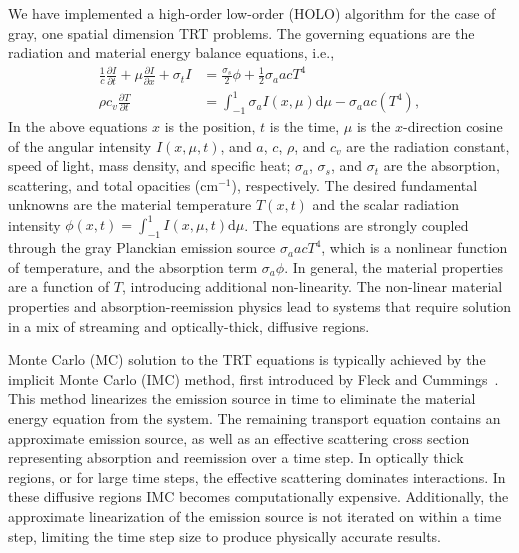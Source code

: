 \documentclass{mc2013}
\newcommand{\pderiv}[2]{\frac{\partial #1}{\partial #2}}
\renewcommand{\d}{\mathrm{d}}
\begin{document}
We have implemented a high-order low-order (HOLO) algorithm for the case of gray, one spatial dimension
TRT problems. The governing equations are the radiation and
material energy balance equations, i.e.,
\begin{align}\label{ho_cont}
    \frac{1}{c}\pderiv{I}{t} + \mu \pderiv{I}{x} + \sigma_t I
&= \frac{\sigma_s}{2} \phi +\frac{1}{2} \sigma_a a c T^4
  \\
  \rho c_v \pderiv{T}{t} &= \int_{-1}^{1} \sigma_a I(x,\mu)
\d\mu - \sigma_a a c (T^4),
\end{align}
In the above equations $x$ is the position, $t$ is the time, $\mu$ is
the $x$-direction cosine of the angular intensity $I(x,\mu,t)$, and $a$, $c$, $\rho$,
and
$c_v$ are the radiation constant, speed of light, mass density, and specific heat; $\sigma_a$, $\sigma_s$, and
$\sigma_t$ are the absorption, scattering, and total
opacities (cm$^{-1}$), respectively. The desired fundamental unknowns are the material
temperature $T(x,t)$ and the scalar radiation intensity $\phi(x,t)=\int_{-1}^1
I(x,\mu,t) \d \mu$. The equations are
strongly coupled through the gray Planckian emission source $\sigma_a a c T^4$, which
is a nonlinear function of temperature, and the absorption
term $\sigma_a \phi$.   In general, the material properties are a function of $T$,
introducing additional non-linearity.  The non-linear material properties and
absorption-reemission physics lead to systems that require solution in a mix of
streaming and optically-thick, diffusive regions. 

Monte Carlo (MC) solution to the TRT equations is typically achieved by the 
implicit Monte Carlo (IMC) method, first introduced by Fleck and Cummings~\cite{fnc}. This
method linearizes the emission source in time to eliminate the material energy equation from the system. The remaining
transport equation contains an approximate emission source, as well as an effective scattering cross section representing
absorption and reemission over a time step.    In optically thick regions, or for
large time steps, the
effective scattering dominates interactions.  In these diffusive regions IMC
becomes computationally expensive. Additionally, the approximate linearization of the emission source is
not iterated on within a time step, limiting the time step size to produce physically
accurate results. 
\end{document}
